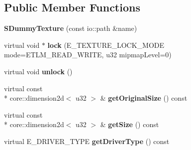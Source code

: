 \subsection*{Public Member Functions}
\begin{DoxyCompactItemize}
\item 
\hypertarget{structirr_1_1video_1_1_c_null_driver_1_1_s_dummy_texture_a5e71b10dd95dcf024d19989d5fed8234}{{\bfseries S\-Dummy\-Texture} (const io\-::path \&name)}\label{structirr_1_1video_1_1_c_null_driver_1_1_s_dummy_texture_a5e71b10dd95dcf024d19989d5fed8234}

\item 
\hypertarget{structirr_1_1video_1_1_c_null_driver_1_1_s_dummy_texture_ab836e14a2c9786408b3aab325a900ece}{virtual void $\ast$ {\bfseries lock} (E\-\_\-\-T\-E\-X\-T\-U\-R\-E\-\_\-\-L\-O\-C\-K\-\_\-\-M\-O\-D\-E mode=E\-T\-L\-M\-\_\-\-R\-E\-A\-D\-\_\-\-W\-R\-I\-T\-E, u32 mipmap\-Level=0)}\label{structirr_1_1video_1_1_c_null_driver_1_1_s_dummy_texture_ab836e14a2c9786408b3aab325a900ece}

\item 
\hypertarget{structirr_1_1video_1_1_c_null_driver_1_1_s_dummy_texture_a8fa6a7dbb5389007468f0e46b05af3da}{virtual void {\bfseries unlock} ()}\label{structirr_1_1video_1_1_c_null_driver_1_1_s_dummy_texture_a8fa6a7dbb5389007468f0e46b05af3da}

\item 
\hypertarget{structirr_1_1video_1_1_c_null_driver_1_1_s_dummy_texture_a96abd019a4d3ef94ffbd89cfa0688042}{virtual const \\*
core\-::dimension2d$<$ u32 $>$ \& {\bfseries get\-Original\-Size} () const }\label{structirr_1_1video_1_1_c_null_driver_1_1_s_dummy_texture_a96abd019a4d3ef94ffbd89cfa0688042}

\item 
\hypertarget{structirr_1_1video_1_1_c_null_driver_1_1_s_dummy_texture_a1b77fbb49822113b68e576cb18027d9c}{virtual const \\*
core\-::dimension2d$<$ u32 $>$ \& {\bfseries get\-Size} () const }\label{structirr_1_1video_1_1_c_null_driver_1_1_s_dummy_texture_a1b77fbb49822113b68e576cb18027d9c}

\item 
\hypertarget{structirr_1_1video_1_1_c_null_driver_1_1_s_dummy_texture_a177529d1604301365dc4d35a51d066a5}{virtual E\-\_\-\-D\-R\-I\-V\-E\-R\-\_\-\-T\-Y\-P\-E {\bfseries get\-Driver\-Type} () const }\label{structirr_1_1video_1_1_c_null_driver_1_1_s_dummy_texture_a177529d1604301365dc4d35a51d066a5}


\end{DoxyCompactItemize}
